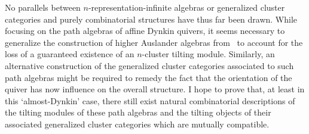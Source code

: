 \documentclass[a4paper,oneside,svgnames]{amsart}
\theoremstyle{plain}
\theoremstyle{definition}
\begin{document}
 No parallels between $n$-representation-infinite algebras or generalized
 cluster categories and purely combinatorial structures have thus far been
 drawn. While focusing on the path algebras of affine Dynkin quivers, it seems
 necessary to generalize the construction of higher Auslander algebras
 from~\cite{iya} to account for the loss of a guaranteed existence of an
 $n$-cluster tilting module. Similarly, an alternative construction of the
 generalized cluster categories associated to such path algebras might be
 required to remedy the fact that the orientation of the quiver has now
 influence on the overall structure. I hope to prove that, at least in this
 `almost-Dynkin' case, there still exist natural combinatorial descriptions of
 the tilting modules of these path algebras and the tilting objects of their
 associated generalized cluster categories which are mutually compatible.

 \printbibliography
\end{document}
